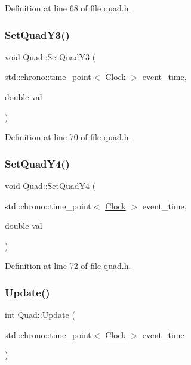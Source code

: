 Definition at line 68 of file quad.\+h.

\mbox{\label{class_quad_a1774a89a5d668aadf94966867270c0c5}} 
\subsubsection{\texorpdfstring{Set\+Quad\+Y3()}{SetQuadY3()}}
{\footnotesize\ttfamily void Quad\+::\+Set\+Quad\+Y3 (\begin{DoxyParamCaption}\item[{std\+::chrono\+::time\+\_\+point$<$ \hyperlink{universe_8h_a0ef8d951d1ca5ab3cfaf7ab4c7a6fd80}{Clock} $>$}]{event\+\_\+time,  }\item[{double}]{val }\end{DoxyParamCaption})\hspace{0.3cm}{\ttfamily [inline]}}



Definition at line 70 of file quad.\+h.

\mbox{\label{class_quad_ae299f75dcd479f5eb6ba8efed578961b}} 
\subsubsection{\texorpdfstring{Set\+Quad\+Y4()}{SetQuadY4()}}
{\footnotesize\ttfamily void Quad\+::\+Set\+Quad\+Y4 (\begin{DoxyParamCaption}\item[{std\+::chrono\+::time\+\_\+point$<$ \hyperlink{universe_8h_a0ef8d951d1ca5ab3cfaf7ab4c7a6fd80}{Clock} $>$}]{event\+\_\+time,  }\item[{double}]{val }\end{DoxyParamCaption})\hspace{0.3cm}{\ttfamily [inline]}}



Definition at line 72 of file quad.\+h.

\mbox{\label{class_quad_a0710e6a7d77a34fdadbd2c36d03ade62}} 
\subsubsection{\texorpdfstring{Update()}{Update()}}
{\footnotesize\ttfamily int Quad\+::\+Update (\begin{DoxyParamCaption}\item[{std\+::chrono\+::time\+\_\+point$<$ \hyperlink{universe_8h_a0ef8d951d1ca5ab3cfaf7ab4c7a6fd80}{Clock} $>$}]{event\+\_\+time }\end{DoxyParamCaption})}



